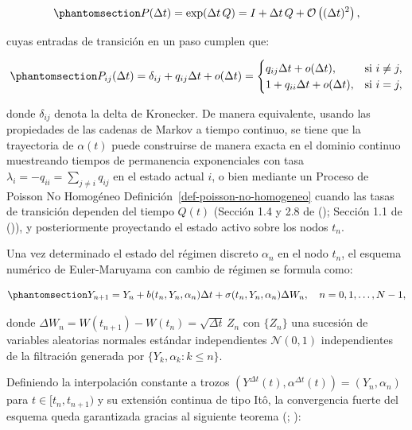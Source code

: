 \documentclass[
  spanish,
  letterpaper,
  DIV=11,
  numbers=noendperiod]{scrreprt}
\theoremstyle{plain}
\theoremstyle{plain}
\theoremstyle{plain}
\theoremstyle{definition}
\theoremstyle{remark}
\begin{document}
\begin{equation}\phantomsection\label{eq-matriz-transicion-discreta}{
P(\Delta t) = \exp(\Delta t \, Q) = I + \Delta t \, Q + \mathcal{O}\left((\Delta t)^2\right),
}\end{equation}

cuyas entradas de transición en un paso cumplen que:

\begin{equation}\phantomsection\label{eq-prob-transicion-paso}{
P_{ij}(\Delta t) = \delta_{ij} + q_{ij}\Delta t + o(\Delta t) = 
\begin{cases} 
q_{ij}\Delta t + o(\Delta t), & \text{si } i \neq j, \\ 
1 + q_{ii}\Delta t + o(\Delta t), & \text{si } i = j,
\end{cases}
}\end{equation}

donde \(\delta_{ij}\) denota la delta de Kronecker. De manera
equivalente, usando las propiedades de las cadenas de Markov a tiempo
continuo, se tiene que la trayectoria de \(\alpha(t)\) puede construirse
de manera exacta en el dominio continuo muestreando tiempos de
permanencia exponenciales con tasa
\(\displaystyle \lambda_i = -q_{ii} = \sum_{j \neq i} q_{ij}\) en el
estado actual \(i\), o bien mediante un Proceso de Poisson No Homogéneo
Definición~\ref{def-poisson-no-homogeneo} cuando las tasas de transición
dependen del tiempo \(Q(t)\) (Sección 1.4 y 2.8 de
(); Sección 1.1 de
()), y
posteriormente proyectando el estado activo sobre los nodos \(t_n\).

Una vez determinado el estado del régimen discreto \(\alpha_n\) en el
nodo \(t_n\), el esquema numérico de Euler-Maruyama con cambio de
régimen se formula como:

\begin{equation}\phantomsection\label{eq-esquema-em-switching}{
Y_{n+1} = Y_n + b(t_n, Y_n, \alpha_n)\Delta t + \sigma(t_n, Y_n, \alpha_n)\Delta W_n, \quad n = 0, 1, \dots, N - 1,
}\end{equation}

donde \(\Delta W_n = W(t_{n+1}) - W(t_n) = \sqrt{\Delta t}\, Z_n\) con
\(\{Z_n\}\) una sucesión de variables aleatorias normales estándar
independientes \(\mathcal{N}(0, 1)\) independientes de la filtración
generada por \(\{Y_k, \alpha_k : k \le n\}\).

Definiendo la interpolación constante a trozos
\((Y^{\Delta t}(t), \alpha^{\Delta t}(t)) = (Y_n, \alpha_n)\) para
\(t \in [t_n, t_{n+1})\) y su extensión continua de tipo Itô, la
convergencia fuerte del esquema queda garantizada gracias al siguiente
teorema (;
):
\end{document}
